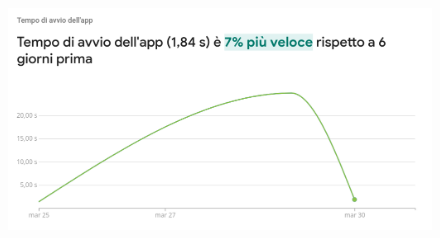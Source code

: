 \documentclass{natourDoc}
\begin{document}
\begin{figure}[!htbp]
	\centering
	\includegraphics[width=\textwidth]{./analytics/start-app.png}
\end{figure}
\FloatBarrier




\printglossary
\end{document}
